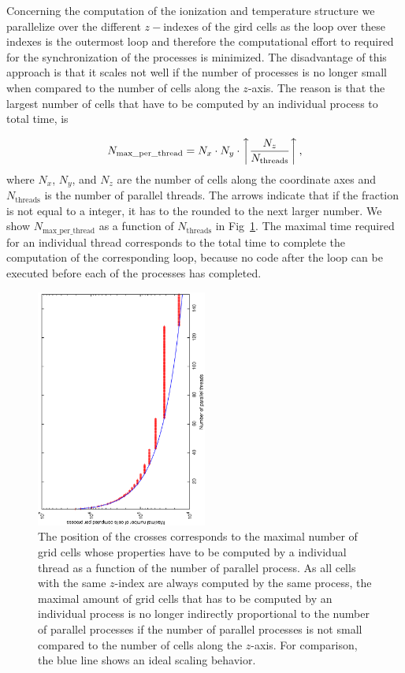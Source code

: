 \documentclass[a4paper,10pt]{article}
\begin{document}
\begin{appendix}
Concerning the computation of the ionization and temperature structure we 
parallelize over the different $z-$indexes of the gird cells as the loop over 
these indexes is the outermost loop and therefore the computational effort to 
required for the synchronization of the processes is minimized. The disadvantage 
of this approach is that it scales not well if the number of processes is no 
longer small when compared to the number of cells along the $z$-axis. The reason 
is that the largest number of cells that have to be computed by an individual 
process to total time, is
 
\begin{equation}
N_\mathrm{max\_per\_thread} = N_x \cdot N_y \cdot \left\uparrow 
\frac{N_z}{N_\mathrm{threads}} \right\uparrow,
\end{equation}
where $N_x$, $N_y$, and $N_z$ are the number of cells along the coordinate axes 
and $N_\mathrm{threads}$ is the number of parallel threads. The arrows indicate 
that if the fraction is not equal to a integer, it has to the rounded to the 
next larger number. We show $N_\mathrm{max\_per\_thread}$ as a function of 
$N_\mathrm{threads}$ in Fig~\ref{fig:maxperthread}. The maximal time required 
for an individual thread corresponds to the total time to complete the 
computation of the corresponding loop, because no code after the loop can be 
executed before each of the processes has completed. 

\begin{figure}
\begin{center}
 \includegraphics[width=0.5\textwidth, angle =-90]{max_per_thread}
\end{center}
\caption{The position of the crosses corresponds to the maximal number of grid 
cells whose properties have to be computed by a individual thread as a function 
of the number of parallel process. As all cells with the same $z$-index are 
always computed by the same process, the maximal amount of grid cells that has 
to be computed by an individual process is no longer indirectly proportional to 
the number of parallel processes if the number of parallel processes is not 
small compared to the number of cells along the $z$-axis. For comparison, the 
blue line shows an ideal scaling behavior.} \label{fig:maxperthread}
\end{figure}


\end{appendix}
\end{document}
